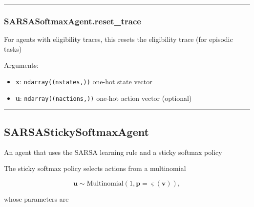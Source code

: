 \begin{center}\rule{0.5\linewidth}{\linethickness}\end{center}

\subsubsection{SARSASoftmaxAgent.reset\_trace}\label{sarsasoftmaxagent.reset_trace}

\begin{Shaded}
\begin{Highlighting}[]
\OperatorTok{=}\NormalTok{)}
\end{Highlighting}
\end{Shaded}

For agents with eligibility traces, this resets the eligibility trace
(for episodic tasks)

Arguments:

\begin{itemize}
\tightlist
\item
  \textbf{x}: \texttt{ndarray((nstates,))} one-hot state vector
\item
  \textbf{u}: \texttt{ndarray((nactions,))} one-hot action vector
  (optional)
\end{itemize}

\begin{center}\rule{0.5\linewidth}{\linethickness}\end{center}

\subsection{SARSAStickySoftmaxAgent}\label{sarsastickysoftmaxagent}

\begin{Shaded}
\begin{Highlighting}[]
\end{Highlighting}
\end{Shaded}

An agent that uses the SARSA learning rule and a sticky softmax policy

The sticky softmax policy selects actions from a multinomial

\[
\mathbf u \sim \mathrm{Multinomial}(1, \mathbf p=\varsigma(\mathbf v)),
\]

whose parameters are

